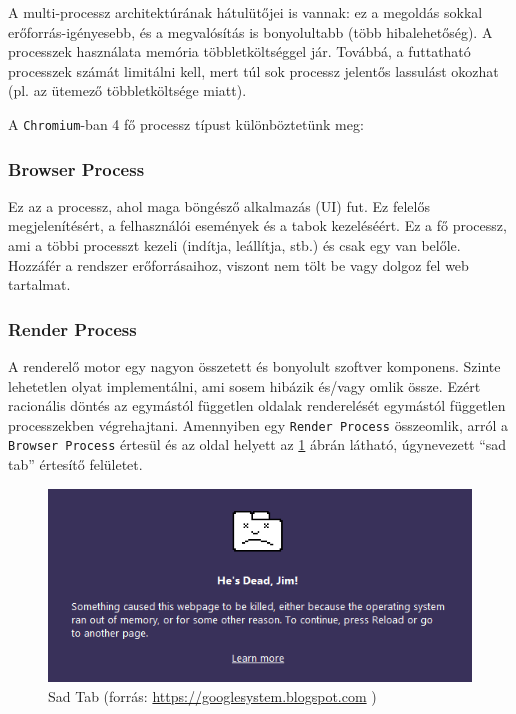 \documentclass[12pt]{report}
\let\origurl\url
\renewcommand{\url}[1]{%
    \textcolor{blue}{\origurl{#1}}
}
\begin{document}
A multi-processz architektúrának hátulütőjei is vannak: ez a megoldás sokkal \\
erőforrás-igényesebb, és a megvalósítás is bonyolultabb (több hibalehetőség).
A processzek használata memória többletköltséggel jár. Továbbá, a futtatható processzek
számát limitálni kell, mert túl sok processz jelentős lassulást okozhat (pl. az ütemező
többletköltsége miatt).

A \texttt{Chromium}-ban 4 fő processz típust különböztetünk meg:

\subsubsection{Browser Process}
Ez az a processz, ahol maga böngésző alkalmazás (UI) fut. Ez felelős megjelenítésért,
a felhasználói események és a tabok kezeléséért. Ez a fő processz, ami a többi processzt
kezeli (indítja, leállítja, stb.) és csak egy van belőle. Hozzáfér a rendszer erőforrásaihoz,
viszont nem tölt be vagy dolgoz fel web tartalmat.

\subsubsection{Render Process}
A renderelő motor egy nagyon összetett és bonyolult szoftver komponens. Szinte lehetetlen
olyat implementálni, ami sosem hibázik és/vagy omlik össze. \cite{bib-chromium-multi-process}
Ezért racionális döntés az egymástól független oldalak renderelését egymástól független
processzekben végrehajtani. Amennyiben egy \texttt{Render Process} összeomlik, arról a
\texttt{Browser Process} értesül és az oldal helyett az \ref{fig-sad-tab} ábrán látható,
úgynevezett ``sad tab'' értesítő felületet.

\begin{figure}[h]
    \centering
    \includegraphics[scale=0.5]{sad_tab}
    \caption{
        \label{fig-sad-tab}
        Sad Tab (forrás: \url{https://googlesystem.blogspot.com} \cite{bib-sad-tab})
    }
\end{figure}
\end{document}
